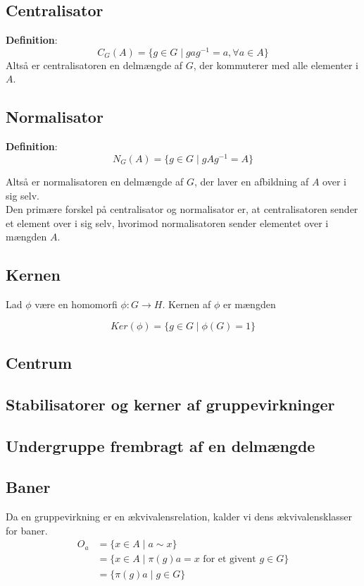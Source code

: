 \documentclass[11pt]{article}
\begin{document}
\subsection*{Centralisator}
\textbf{Definition}:\\
$$C_G(A) = \{ g \in G \mid g a g^{-1} = a,  \forall{a} \in A \}$$
Altså er centralisatoren en delmængde af $G$, der kommuterer med alle elementer i $A$.\\

\subsection*{Normalisator}
\textbf{Definition}:\\
$$N_G(A) = \{ g \in G \mid gAg^{-1} = A\}$$

Altså er normalisatoren en delmængde af $G$, der laver en afbildning af $A$ over i sig selv.\\

Den primære forskel på centralisator og normalisator er, at centralisatoren sender et element over i sig selv, hvorimod normalisatoren sender elementet over i mængden $A$.

\subsection*{Kernen}
Lad $\phi$ være en homomorfi $\phi : G \to H$. Kernen af $\phi$ er mængden

$$Ker(\phi) = \{ g \in G \mid \phi(G) = 1 \}$$

\subsection*{Centrum}

\subsection*{Stabilisatorer og kerner af gruppevirkninger}

\subsection*{Undergruppe frembragt af en delmængde}

\subsection*{Baner}
Da en gruppevirkning er en ækvivalensrelation, kalder vi dens ækvivalensklasser for baner.\\
\begin{align*}
  O_a &= \{ x \in A \mid a \sim x \}\\
  &= \{ x \in A \mid \pi(g)a = x \text{ for et givent } g \in G \}\\
  &= \{ \pi(g)a \mid g \in G \}
\end{align*}
\end{document}
